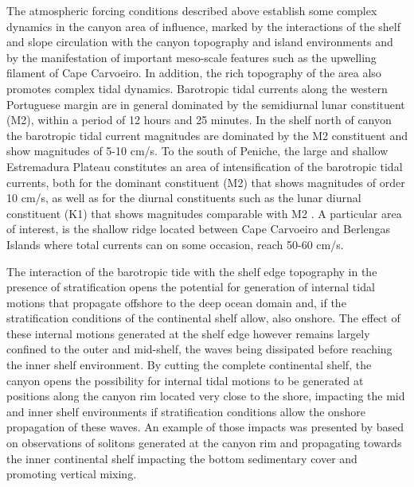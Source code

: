 The atmospheric forcing conditions described above establish some
complex dynamics in the \naz canyon area of influence, marked by the
interactions of the shelf and slope circulation with the canyon
topography and island environments and by the manifestation of
important meso-scale features such as the upwelling filament of Cape
Carvoeiro. In addition, the rich topography of the area also promotes
complex tidal dynamics. Barotropic tidal currents along the western
Portuguese margin are in general dominated by the semidiurnal lunar
constituent (M2), within a period of 12 hours and 25 minutes.  In the
shelf north of \naz canyon the barotropic tidal current magnitudes are
dominated by the M2 constituent and show magnitudes of 5-10 cm/s. To
the south of Peniche, the large and shallow Estremadura Plateau
constitutes an area of intensification of the barotropic tidal
currents, both for the dominant constituent (M2) that shows magnitudes
of order 10 cm/s, as well as for the diurnal constituents such as the
lunar diurnal constituent (K1) that shows magnitudes comparable with
M2 \cite{marta06,quaresma13}. A particular area of interest, is the
shallow ridge located between Cape Carvoeiro and Berlengas Islands
where total currents can on some occasion, reach 50-60 cm/s.


The interaction of the barotropic tide with the shelf edge topography
in the presence of stratification opens the potential for generation
of internal tidal motions that propagate offshore to the deep ocean
domain and, if the stratification conditions of the continental shelf
allow, also onshore. The effect of these internal motions generated at
the shelf edge however remains largely confined to the outer and
mid-shelf, the waves being dissipated before reaching the inner shelf
environment. By cutting the complete continental shelf, the \naz
canyon opens the possibility for internal tidal motions to be
generated at positions along the canyon rim located very close to the
shore, impacting the mid and inner shelf environments if
stratification conditions allow the onshore propagation of these
waves. An example of those impacts was presented by \cite{quaresma07}
based on observations of solitons generated at the canyon rim and
propagating towards the inner continental shelf impacting the bottom
sedimentary cover and promoting vertical mixing.


